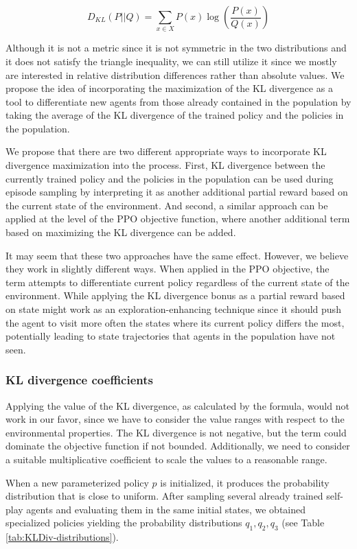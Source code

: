 \[
    D_{KL}(P||Q) = \sum_{x \in X}P(x)\log\left(\frac{P(x)}{Q(x)}\right)
\]

Although it is not a metric since it is not symmetric in the two distributions and it does not satisfy the triangle inequality, we can still utilize it since we mostly are interested in relative distribution differences rather than absolute values.
We propose the idea of incorporating the maximization of the KL divergence as a tool to differentiate new agents from those already contained in the population by taking the average of the KL divergence of the trained policy and the policies in the population.

We propose that there are two different appropriate ways to incorporate KL divergence maximization into the process.
First, KL divergence between the currently trained policy and the policies in the population can be used during episode sampling by interpreting it as another additional partial reward based on the current state of the environment.
And second, a similar approach can be applied at the level of the PPO objective function, where another additional term based on maximizing the KL divergence can be added.

It may seem that these two approaches have the same effect.
However, we believe they work in slightly different ways.
When applied in the PPO objective, the term attempts to differentiate current policy regardless of the current state of the environment.
While applying the KL divergence bonus as a partial reward based on state might work as an exploration-enhancing technique since it should push the agent to visit more often the states where its current policy differs the most, potentially leading to state trajectories that agents in the population have not seen.

\subsubsection{KL divergence coefficients}
Applying the value of the KL divergence, as calculated by the formula, would not work in our favor, since we have to consider the value ranges with respect to the environmental properties.
The KL divergence is not negative, but the term could dominate the objective function if not bounded.
Additionally, we need to consider a suitable multiplicative coefficient to scale the values to a reasonable range.

When a new parameterized policy $p$ is initialized, it produces the probability distribution that is close to uniform.
After sampling several already trained self-play agents and evaluating them in the same initial states, we obtained specialized policies yielding the probability distributions $q_1, q_2, q_3$ (see Table \ref{tab:KLDiv-distributions}).


